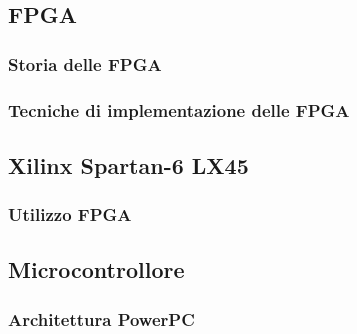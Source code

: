 \subsection{FPGA}

\subsubsection{Storia delle FPGA}

\subsubsection{Tecniche di implementazione delle FPGA}

\subsection{Xilinx Spartan-6 LX45}

\subsubsection{Utilizzo FPGA}

\subsection{Microcontrollore}

\subsubsection{Architettura PowerPC}
